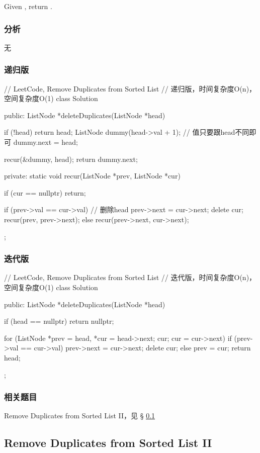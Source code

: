 Given , return .


\subsubsection{分析}
无


\subsubsection{递归版}
\begin{Code}
	// LeetCode, Remove Duplicates from Sorted List
	// 递归版，时间复杂度O(n)，空间复杂度O(1)
	class Solution {
		public:
		ListNode *deleteDuplicates(ListNode *head) {
			if (!head) return head;
			ListNode dummy(head->val + 1); // 值只要跟head不同即可
			dummy.next = head;
			
			recur(&dummy, head);
			return dummy.next;
		}
		private:
		static void recur(ListNode *prev, ListNode *cur) {
			if (cur == nullptr) return;
			
			if (prev->val == cur->val) { // 删除head
				prev->next = cur->next;
				delete cur;
				recur(prev, prev->next);
			} else {
			recur(prev->next, cur->next);
		}
	}
};
\end{Code}


\subsubsection{迭代版}
\begin{Code}
	// LeetCode, Remove Duplicates from Sorted List
	// 迭代版，时间复杂度O(n)，空间复杂度O(1)
	class Solution {
		public:
		ListNode *deleteDuplicates(ListNode *head) {
			if (head == nullptr) return nullptr;
			
			for (ListNode *prev = head, *cur = head->next; cur; cur = 
			cur->next) {
				if (prev->val == cur->val) {
					prev->next = cur->next;
					delete cur;
				} else {
				prev = cur;
			}
		}
		return head;
	}
};
\end{Code}


\subsubsection{相关题目}

\begindot
\item Remove Duplicates from Sorted List II，见 \S 
\ref{sec:remove-duplicates-from-sorted-list-ii}
\myenddot


\subsection{Remove Duplicates from Sorted List II}
\label{sec:remove-duplicates-from-sorted-list-ii}


